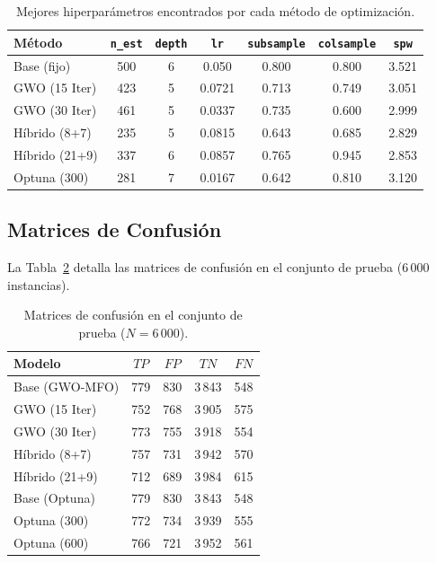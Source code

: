 \documentclass[journal]{IEEEtran}
\begin{document}
\begin{table}[!t]
\caption{Mejores hiperparámetros encontrados por cada método de optimización.}
\label{tab:bestparams}
\centering
\small
\begin{tabular}{lcccccc}
\toprule
Método & \texttt{n\_est} & \texttt{depth} & \texttt{lr} & \texttt{subsample} & \texttt{colsample} & \texttt{spw} \\
\midrule
Base (fijo) & 500 & 6 & 0.050 & 0.800 & 0.800 & 3.521 \\
GWO (15 Iter) & 423 & 5 & 0.0721 & 0.713 & 0.749 & 3.051 \\
GWO (30 Iter) & 461 & 5 & 0.0337 & 0.735 & 0.600 & 2.999 \\
Híbrido (8+7) & 235 & 5 & 0.0815 & 0.643 & 0.685 & 2.829 \\
Híbrido (21+9) & 337 & 6 & 0.0857 & 0.765 & 0.945 & 2.853 \\
Optuna (300) & 281 & 7 & 0.0167 & 0.642 & 0.810 & 3.120 \\
\bottomrule
\end{tabular}
\end{table}

\subsection{Matrices de Confusión}
La Tabla~\ref{tab:confusion} detalla las matrices de confusión en el conjunto de prueba (6\,000 instancias).

\begin{table}[!t]
\caption{Matrices de confusión en el conjunto de prueba ($N = 6\,000$).}
\label{tab:confusion}
\centering
\small
\begin{tabular}{lcccc}
\toprule
Modelo & $TP$ & $FP$ & $TN$ & $FN$ \\
\midrule
Base (GWO-MFO) & 779 & 830 & 3\,843 & 548 \\
GWO (15 Iter) & 752 & 768 & 3\,905 & 575 \\
GWO (30 Iter) & 773 & 755 & 3\,918 & 554 \\
Híbrido (8+7) & 757 & 731 & 3\,942 & 570 \\
Híbrido (21+9) & 712 & 689 & 3\,984 & 615 \\
Base (Optuna) & 779 & 830 & 3\,843 & 548 \\
Optuna (300) & 772 & 734 & 3\,939 & 555 \\
Optuna (600) & 766 & 721 & 3\,952 & 561 \\
\bottomrule
\end{tabular}
\end{table}
\end{document}
